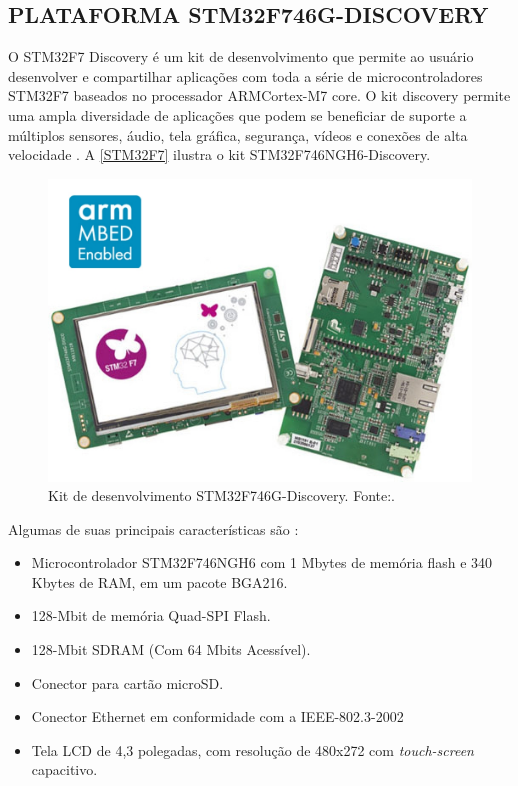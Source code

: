 \subsection{PLATAFORMA STM32F746G-DISCOVERY}

O STM32F7 Discovery é um kit de desenvolvimento que permite ao usuário desenvolver e compartilhar aplicações com toda a série de microcontroladores STM32F7 baseados no processador ARM\textregistered  Cortex\textregistered-M7 core.
O kit discovery permite uma ampla diversidade de aplicações que podem se beneficiar de suporte a múltiplos sensores, áudio, tela gráfica, segurança, vídeos e conexões de alta velocidade \cite{STM32F7}.
A \autoref{STM32F7} ilustra o kit STM32F746NGH6-Discovery.

\begin{figure}[H]
    \scriptsize
     \centering
     \includegraphics[scale=0.4]{dados/figuras/STM32F7.jpg}
     \caption{Kit de desenvolvimento STM32F746G-Discovery. \newline Fonte:\cite{STM32F7}.}
     \label{STM32F7}
\end{figure}

Algumas de suas principais características são \cite{STM32F7}:
\begin{itemize}
    \item Microcontrolador STM32F746NGH6 com 1 Mbytes de memória flash e 340 Kbytes de RAM, em um pacote BGA216.
    \item 128-Mbit de memória Quad-SPI Flash.
    \item 128-Mbit SDRAM (Com 64 Mbits Acessível).
    \item Conector para cartão microSD.
    \item Conector Ethernet em conformidade com a IEEE-802.3-2002
    \item Tela LCD de 4,3 polegadas, com resolução de 480x272 com \textit{touch-screen} capacitivo.
    
\end{itemize}